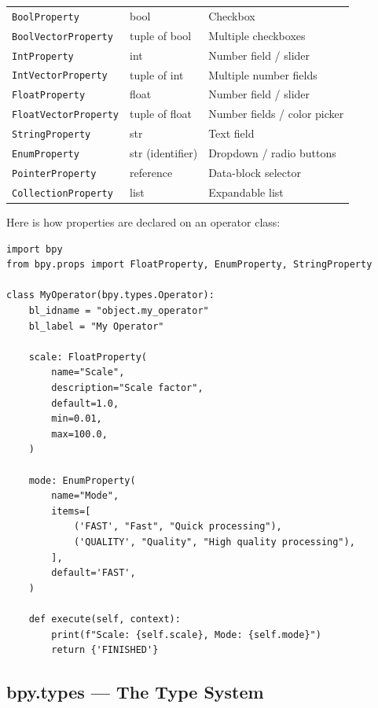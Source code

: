\begin{center}
\begin{tabularx}{\textwidth}{L{4cm}L{2.5cm}X}
\toprule
{}
 &  &  \\
\midrule
\texttt{BoolProperty} & bool & Checkbox \\
\texttt{BoolVectorProperty} & tuple of bool & Multiple checkboxes \\
\texttt{IntProperty} & int & Number field / slider \\
\texttt{IntVectorProperty} & tuple of int & Multiple number fields \\
\texttt{FloatProperty} & float & Number field / slider \\
\texttt{FloatVectorProperty} & tuple of float & Number fields / color picker \\
\texttt{StringProperty} & str & Text field \\
\texttt{EnumProperty} & str (identifier) & Dropdown / radio buttons \\
\texttt{PointerProperty} & reference & Data-block selector \\
\texttt{CollectionProperty} & list & Expandable list \\
\bottomrule
\end{tabularx}
\end{center}

Here is how properties are declared on an operator class:

\begin{lstlisting}
import bpy
from bpy.props import FloatProperty, EnumProperty, StringProperty

class MyOperator(bpy.types.Operator):
    bl_idname = "object.my_operator"
    bl_label = "My Operator"

    scale: FloatProperty(
        name="Scale",
        description="Scale factor",
        default=1.0,
        min=0.01,
        max=100.0,
    )

    mode: EnumProperty(
        name="Mode",
        items=[
            ('FAST', "Fast", "Quick processing"),
            ('QUALITY', "Quality", "High quality processing"),
        ],
        default='FAST',
    )

    def execute(self, context):
        print(f"Scale: {self.scale}, Mode: {self.mode}")
        return {'FINISHED'}
\end{lstlisting}

\subsection{bpy.types --- The Type System}

